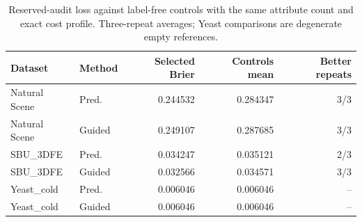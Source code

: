 \begin{table}[htbp]
\centering\small
\caption{Reserved-audit loss against label-free controls with the same attribute count and exact cost profile. Three-repeat averages; Yeast comparisons are degenerate empty references.}
\begin{tabular}{llrrr}
\hline
Dataset & Method & Selected Brier & Controls mean & Better repeats\\
\hline
Natural Scene & Pred. & 0.244532 & 0.284347 & 3/3\\
Natural Scene & Guided & 0.249107 & 0.287685 & 3/3\\
SBU\_3DFE & Pred. & 0.034247 & 0.035121 & 2/3\\
SBU\_3DFE & Guided & 0.032566 & 0.034571 & 3/3\\
Yeast\_cold & Pred. & 0.006046 & 0.006046 & --\\
Yeast\_cold & Guided & 0.006046 & 0.006046 & --\\
\hline
\end{tabular}
\end{table}
